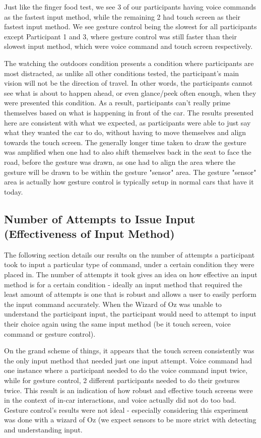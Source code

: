 \documentclass{sigchi}
\begin{document}
Just like the finger food test, we see 3 of our participants having voice commands as the fastest input method, while the remaining 2 had touch screen as their fastest input method. We see gesture control being the slowest for all participants except Participant 1 and 3, where gesture control was still faster than their slowest input method, which were voice command and touch screen respectively.

The watching the outdoors condition presents a condition where participants are most distracted, as unlike all other conditions tested, the participant's main vision will not be the direction of travel. In other words, the participants cannot see what is about to happen ahead, or even glance/peek often enough, when they were presented this condition. As a result, participants can't really prime themselves based on what is happening in front of the car. The results presented here are consistent with what we expected, as participants were able to just say what they wanted the car to do, without having to move themselves and align towards the touch screen. The generally longer time taken to draw the gesture was amplified when one had to also shift themselves back in the seat to face the road, before the gesture was drawn, as one had to align the area where the gesture will be drawn to be within the gesture "sensor" area. The gesture "sensor" area is actually how gesture control is typically setup in normal cars that have it today.
\subsection{Number of Attempts to Issue Input (Effectiveness of Input Method)}

The following section details our results on the number of attempts a participant took to input a particular type of command, under a certain condition they were placed in. The number of attempts it took gives an idea on how effective an input method is for a certain condition - ideally an input method that required the least amount of attempts is one that is robust and allows a user to easily perform the input command accurately. When the Wizard of Oz was unable to understand the participant input, the participant would need to attempt to input their choice again using the same input method (be it touch screen, voice command or gesture control).

On the grand scheme of things, it appears that the touch screen consistently was the only input method that needed just one input attempt. Voice command had one instance where a participant needed to do the voice command input twice, while for gesture control, 2 different participants needed to do their gestures twice. This result is an indication of how robust and effective touch screens were in the context of in-car interactions, and voice actually did not do too bad. Gesture control's results were not ideal - especially considering this experiment was done with a wizard of Oz (we expect sensors to be more strict with detecting and understanding input.
\end{document}
